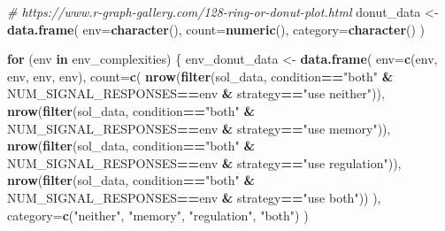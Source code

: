 \documentclass[
]{book}
\newenvironment{Shaded}{\begin{snugshade}}{\end{snugshade}}
\newcommand{\CommentTok}[1]{\textcolor[rgb]{0.56,0.35,0.01}{\textit{#1}}}
\newcommand{\ControlFlowTok}[1]{\textcolor[rgb]{0.13,0.29,0.53}{\textbf{#1}}}
\newcommand{\DataTypeTok}[1]{\textcolor[rgb]{0.13,0.29,0.53}{#1}}
\newcommand{\KeywordTok}[1]{\textcolor[rgb]{0.13,0.29,0.53}{\textbf{#1}}}
\newcommand{\NormalTok}[1]{#1}
\newcommand{\OperatorTok}[1]{\textcolor[rgb]{0.81,0.36,0.00}{\textbf{#1}}}
\newcommand{\StringTok}[1]{\textcolor[rgb]{0.31,0.60,0.02}{#1}}
\begin{document}
\begin{Shaded}
\begin{Highlighting}[]
\CommentTok{\# https://www.r{-}graph{-}gallery.com/128{-}ring{-}or{-}donut{-}plot.html}
\NormalTok{donut\_data \textless{}{-}}\StringTok{ }\KeywordTok{data.frame}\NormalTok{(}
  \DataTypeTok{env=}\KeywordTok{character}\NormalTok{(),}
  \DataTypeTok{count=}\KeywordTok{numeric}\NormalTok{(),}
  \DataTypeTok{category=}\KeywordTok{character}\NormalTok{()}
\NormalTok{)}

\ControlFlowTok{for}\NormalTok{ (env }\ControlFlowTok{in}\NormalTok{ env\_complexities) \{}
\NormalTok{  env\_donut\_data  \textless{}{-}}\StringTok{ }\KeywordTok{data.frame}\NormalTok{(}
    \DataTypeTok{env=}\KeywordTok{c}\NormalTok{(env, env, env, env),}
    \DataTypeTok{count=}\KeywordTok{c}\NormalTok{(}
      \KeywordTok{nrow}\NormalTok{(}\KeywordTok{filter}\NormalTok{(sol\_data, condition}\OperatorTok{==}\StringTok{"both"} \OperatorTok{\&}\StringTok{ }\NormalTok{NUM\_SIGNAL\_RESPONSES}\OperatorTok{==}\NormalTok{env }\OperatorTok{\&}\StringTok{ }\NormalTok{strategy}\OperatorTok{==}\StringTok{"use neither"}\NormalTok{)),}
      \KeywordTok{nrow}\NormalTok{(}\KeywordTok{filter}\NormalTok{(sol\_data, condition}\OperatorTok{==}\StringTok{"both"} \OperatorTok{\&}\StringTok{ }\NormalTok{NUM\_SIGNAL\_RESPONSES}\OperatorTok{==}\NormalTok{env }\OperatorTok{\&}\StringTok{ }\NormalTok{strategy}\OperatorTok{==}\StringTok{"use memory"}\NormalTok{)),}
      \KeywordTok{nrow}\NormalTok{(}\KeywordTok{filter}\NormalTok{(sol\_data, condition}\OperatorTok{==}\StringTok{"both"} \OperatorTok{\&}\StringTok{ }\NormalTok{NUM\_SIGNAL\_RESPONSES}\OperatorTok{==}\NormalTok{env }\OperatorTok{\&}\StringTok{ }\NormalTok{strategy}\OperatorTok{==}\StringTok{"use regulation"}\NormalTok{)),}
      \KeywordTok{nrow}\NormalTok{(}\KeywordTok{filter}\NormalTok{(sol\_data, condition}\OperatorTok{==}\StringTok{"both"} \OperatorTok{\&}\StringTok{ }\NormalTok{NUM\_SIGNAL\_RESPONSES}\OperatorTok{==}\NormalTok{env }\OperatorTok{\&}\StringTok{ }\NormalTok{strategy}\OperatorTok{==}\StringTok{"use both"}\NormalTok{))}
\NormalTok{    ),}
    \DataTypeTok{category=}\KeywordTok{c}\NormalTok{(}\StringTok{"neither"}\NormalTok{, }\StringTok{"memory"}\NormalTok{, }\StringTok{"regulation"}\NormalTok{, }\StringTok{"both"}\NormalTok{)}
\NormalTok{  )}


\end{Highlighting}
\end{Shaded}
\end{document}
